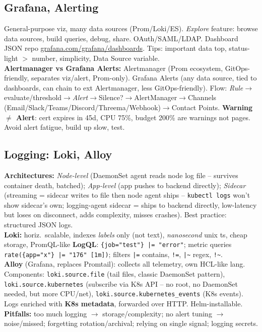 \subsection{Grafana, Alerting}
General-purpose viz, many data sources (Prom/Loki/ES). \textit{Explore} feature: browse data sources, build queries, debug, share. OAuth/SAML/LDAP. Dashboard JSON repo \url{grafana.com/grafana/dashboards}. Tips: important data top, status-light $>$ number, simplicity, Data Source variable. \\
\textbf{Alertmanager vs Grafana Alerts:} Alertmanager (Prom ecosystem, GitOps-friendly, separates viz/alert, Prom-only). Grafana Alerts (any data source, tied to dashboards, can chain to ext Alertmanager, less GitOps-friendly). Flow: \textit{Rule}$\rightarrow$evaluate/threshold$\rightarrow$\textit{Alert}$\rightarrow$Silence?$\rightarrow$AlertManager$\rightarrow$Channels (Email/Slack/Teams/Discord/Threema/Webhook)$\rightarrow$Contact Points. \textbf{Warning $\ne$ Alert}: cert expires in 45d, CPU 75\%, budget 200\% are warnings not pages. Avoid alert fatigue, build up slow, test.

\subsection{Logging: Loki, Alloy}
\textbf{Architectures:} \textit{Node-level} (DaemonSet agent reads node log file -- survives container death, batched); \textit{App-level} (app pushes to backend directly); \textit{Sidecar} (streaming = sidecar writes to file then node agent ships -- \texttt{kubectl logs} won't show sidecar's own; logging-agent sidecar = ships to backend directly, low-latency but loses on disconnect, adds complexity, misses crashes). Best practice: structured JSON logs. \\
\textbf{Loki:} horiz.\ scalable, indexes \textit{labels} only (not text), \textit{nanosecond} unix ts, cheap storage, PromQL-like \textbf{LogQL}: \texttt{\{job="test"\} |= "error"}; metric queries \texttt{rate(\{app="x"\} |= "176" [1m])}; filters \texttt{|=} contains, \texttt{!=}, \texttt{|\~{}} regex, \texttt{!\~{}}. \\
\textbf{Alloy} (Grafana, replaces Promtail): collects all telemetry, own HCL-like lang. Components: \texttt{loki.source.file} (tail files, classic DaemonSet pattern), \texttt{loki.source.kubernetes} (subscribe via K8s API -- no root, no DaemonSet needed, but more CPU/net), \texttt{loki.source.kubernetes\_events} (K8s events). Logs enriched with \textbf{K8s metadata}, forwarded over HTTP. Helm-installable. \\
\textbf{Pitfalls:} too much logging $\rightarrow$ storage/complexity; no alert tuning $\rightarrow$ noise/missed; forgetting rotation/archival; relying on single signal; logging secrets.
